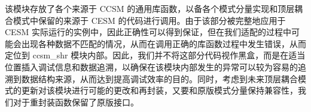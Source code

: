 该模块存放了各个来源于 CCSM 的通用库函数，以备各个模式分量实现和顶层耦合模式中保留的来源于 CESM 的代码进行调用。由于该部分被完整地应用于 CESM 实际运行的实例中，因此正确性可以得到保证，但在我们适配的过程中可能会出现各种数据不匹配的情况，从而在调用正确的库函数过程中发生错误，从而定位到 ccsm\_shr 模块内部。因此，我们并不将这部分代码视作黑盒，而是在适当位置插入调试信息和数据追溯，以确保在该模块内部发生的异常可以较为容易的追溯到数据结构来源，从而达到提高调试效率的目的。同时，考虑到未来顶层耦合模式的更新对该模块进行可能的更改和再封装，又要和原版模式分量保持兼容性，我们对于重封装函数保留了原版接口。
